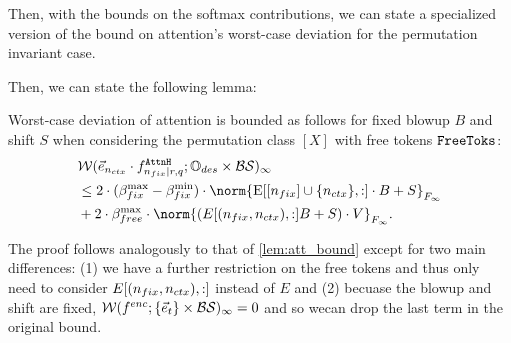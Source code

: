 Then, with the bounds on the softmax contributions, we can state a specialized version of the bound on attention's worst-case deviation for the permutation invariant case.

Then, we can state the following lemma:
\begin{lemma}
	\label{lem:attn_perm}
	Worst-case deviation of attention is bounded as follows for fixed blowup $B$ and shift $S$ when considering the permutation class $[X]$ with free tokens $\texttt{FreeToks}$:
	\begin{align*}
		&\WD(\vecNctx \cdot f^{\attnH}_{\ndes \mid r, q} ; \InpSpace \times \blowupSet \shiftSet)_\infty
	     \\ &\leq
		2 \cdot (\ssMaxRB - \ssMinRB) \cdot \norm{\Embed[[\nfix] \cup \{\nctx\}, :] \cdot B + S}_{\frobInf} \\
		&+ 2 \cdot \ssMaxFB \cdot \norm{(E[(\nfix,\nctx),: ] B + S) \cdot V}_{\frobInf}.
	\end{align*}
\end{lemma}
The proof follows analogously to that of \cref{lem:att_bound} except for two main differences:
(1) we have a further restriction on the free tokens and thus only need to consider $E[(n_{fix},{n_{ctx}}), :]$ instead of $E$
and (2) becuase the blowup and shift are fixed, $\mathcal{W}(f^{enc}; \{\vec{e}_t\} \times \mathcal{B} \mathcal{S})_\infty = 0$ and so wecan drop the last term in the original bound.



